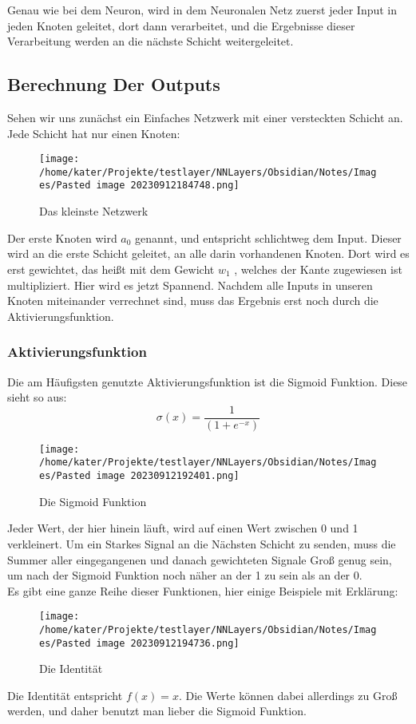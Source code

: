 \documentclass[12pt]{article}
\begin{document}
  Genau wie bei dem Neuron, wird in dem Neuronalen Netz zuerst jeder Input in jeden Knoten geleitet, dort dann verarbeitet, und die Ergebnisse dieser Verarbeitung werden an die nächste Schicht weitergeleitet.\subsection{ Berechnung Der Outputs}Sehen wir uns zunächst ein Einfaches Netzwerk mit einer versteckten Schicht an. Jede Schicht hat nur einen Knoten:
\begin{figure}[H]
\centering
\texttt{[image: /home/kater/Projekte/testlayer/NNLayers/Obsidian/Notes/Images/Pasted image 20230912184748.png]}
\caption{Das kleinste Netzwerk}
\label{Was kommt hier rein?}\end{figure}Der erste Knoten wird $a_0$ genannt, und entspricht schlichtweg dem Input. Dieser wird an die erste Schicht geleitet, an alle darin vorhandenen Knoten. Dort wird es erst gewichtet, das heißt mit dem Gewicht $w_1$ , welches der Kante zugewiesen ist multipliziert. Hier wird es jetzt Spannend. Nachdem alle Inputs in unseren Knoten miteinander verrechnet sind, muss das Ergebnis erst noch durch die Aktivierungsfunktion.\subsubsection{ Aktivierungsfunktion}Die am Häufigsten genutzte Aktivierungsfunktion ist die Sigmoid Funktion. Diese sieht so aus:
$$\sigma (x)=\frac{1}{(1+e^{-x})}$$
\begin{figure}[H]
\centering
\texttt{[image: /home/kater/Projekte/testlayer/NNLayers/Obsidian/Notes/Images/Pasted image 20230912192401.png]}
\caption{Die Sigmoid Funktion}
\label{Was kommt hier rein?}\end{figure}
Jeder Wert, der hier hinein läuft, wird auf einen Wert zwischen 0 und 1 verkleinert. 
Um ein Starkes Signal an die Nächsten Schicht zu senden, muss die Summer aller eingegangenen und danach gewichteten Signale Groß genug sein, um nach der Sigmoid Funktion noch näher an der 1 zu sein als an der 0. 
\\Es gibt eine ganze Reihe dieser Funktionen, hier einige Beispiele mit Erklärung:
\begin{figure}[H]
\centering
\texttt{[image: /home/kater/Projekte/testlayer/NNLayers/Obsidian/Notes/Images/Pasted image 20230912194736.png]}
\caption{Die Identität}
\label{Was kommt hier rein?}\end{figure}
Die Identität entspricht $f(x) = x$. Die Werte können dabei allerdings zu Groß werden, und daher benutzt man lieber die Sigmoid Funktion. 
\end{document}

